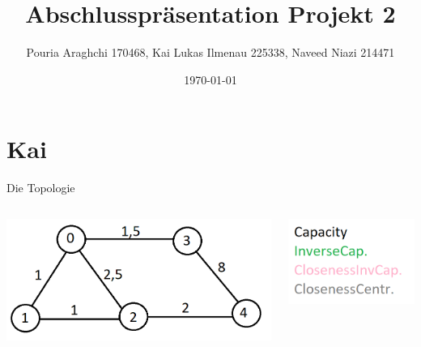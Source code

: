 \documentclass[aspectratio=169,10pt]{beamer}
\title{Abschlusspr\"asentation Projekt 2}
\author{Pouria Araghchi 170468, Kai Lukas Ilmenau 225338, Naveed Niazi 214471}
\institute{TU Dortmund - Fachprojekt zu "Routingalgorithmen"}
\date{\today}
\begin{document}
\maketitle
\section{Kai}

\begin{frame}{Die Topologie}
\begin{columns}
\begin{column}[t]{0.7\paperwidth}
\includegraphics[width=\textwidth]{images/kai1.png}
\end{column}
\begin{column}[t]{0.3\paperwidth}
\includegraphics[width=\textwidth]{images/kai_legend.png}
\end{column}
\end{columns}
\end{frame}
\end{document}

